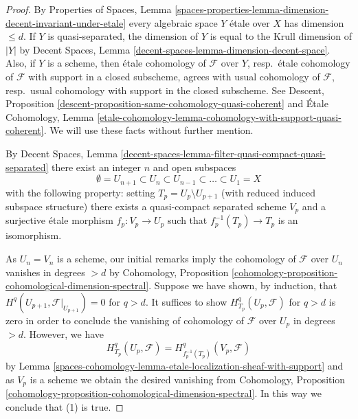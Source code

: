 \begin{proof}
By Properties of Spaces, Lemma
\ref{spaces-properties-lemma-dimension-decent-invariant-under-etale}
every algebraic space $Y$ \'etale over $X$ has dimension $\leq d$.
If $Y$ is quasi-separated, the dimension of $Y$ is equal to the
Krull dimension of $|Y|$ by
Decent Spaces, Lemma \ref{decent-spaces-lemma-dimension-decent-space}.
Also, if $Y$ is a scheme, then \'etale cohomology of $\mathcal{F}$
over $Y$, resp.\ \'etale cohomology of $\mathcal{F}$ with support in a
closed subscheme, agrees with usual cohomology of $\mathcal{F}$,
resp.\ usual cohomology with support in the closed subscheme.
See
Descent, Proposition \ref{descent-proposition-same-cohomology-quasi-coherent}
and
\'Etale Cohomology, Lemma
\ref{etale-cohomology-lemma-cohomology-with-support-quasi-coherent}.
We will use these facts without further mention.

\medskip\noindent
By Decent Spaces, Lemma
\ref{decent-spaces-lemma-filter-quasi-compact-quasi-separated}
there exist an integer $n$ and open subspaces
$$
\emptyset = U_{n + 1} \subset
U_n \subset U_{n - 1} \subset \ldots \subset U_1 = X
$$
with the following property: setting $T_p = U_p \setminus U_{p + 1}$
(with reduced induced subspace structure) there exists a quasi-compact
separated scheme $V_p$ and a surjective \'etale morphism $f_p : V_p \to U_p$
such that $f_p^{-1}(T_p) \to T_p$ is an isomorphism.

\medskip\noindent
As $U_n = V_n$ is a scheme, our initial remarks imply the cohomology of
$\mathcal{F}$ over $U_n$ vanishes in degrees $> d$ by
Cohomology, Proposition
\ref{cohomology-proposition-cohomological-dimension-spectral}.
Suppose we have shown, by induction, that
$H^q(U_{p + 1}, \mathcal{F}|_{U_{p + 1}}) = 0$ for $q > d$.
It suffices to show $H_{T_p}^q(U_p, \mathcal{F})$ for
$q > d$ is zero in order to conclude the vanishing of cohomology
of $\mathcal{F}$ over $U_p$ in degrees $> d$.
However, we have
$$
H^q_{T_p}(U_p, \mathcal{F}) = H^q_{f_p^{-1}(T_p)}(V_p, \mathcal{F})
$$
by Lemma \ref{spaces-cohomology-lemma-etale-localization-sheaf-with-support}
and as $V_p$ is a scheme we obtain the desired vanishing from
Cohomology, Proposition
\ref{cohomology-proposition-cohomological-dimension-spectral}.
In this way we conclude that (1) is true.


\end{proof}
